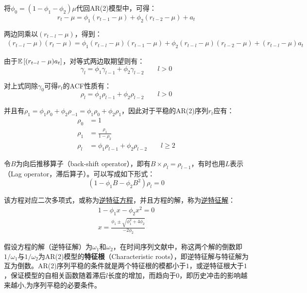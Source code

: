 \documentclass[11pt]{article}
\begin{document}
将$\phi_0 = (1-\phi_1-\phi_2)\mu$代回AR(2)模型中，可得：
\begin{equation*}
    r_t - \mu = \phi_1(r_{t-1}-\mu) + \phi_2(r_{t-2}-\mu) + a_t
\end{equation*}

两边同乘以$(r_{t-l}-\mu)$，得到：
\begin{align*}
    (r_{t-l} - \mu)(r_t - \mu) = \phi_1 (r_{t-l}-\mu)(r_{t-1} - \mu)
    + \phi_2 (r_{t-l}-\mu)(r_{t-2} - \mu) + (r_{t-l}-\mu) a_t
\end{align*}

由于$\mathbb{E}\left[(r_{t-l} - \mu)a_t\right]$，对等式两边取期望则有：
\begin{equation*}
    \gamma_l = \phi_1 \gamma_{l-1} + \phi_2 \gamma_{l-2} \qquad l>0
\end{equation*}

对上式同除$\gamma_0$可得$r_t$的ACF性质有：
\begin{equation*}
    \rho_l = \phi_1 \rho_{l-1} + \phi_2 \rho_{l-2} \qquad l>0
\end{equation*}

并且有$\rho_1 = \phi_1 \rho_{0} + \phi_2 \rho_{-1} = \phi_1 \rho_{0} + \phi_2 \rho_{1} $，因此对于平稳的AR(2)序列$r_t$应有：
\begin{align*}
    \rho_0 &= 1 \\
    \rho_1 &= \frac{\rho_1}{1-\rho_2} \\
    \rho_l &= \phi_1 \rho_{l-1} + \phi_2 \rho_{l-2} \qquad l \geq 2
\end{align*}

令$B$为向后推移算子（back-shift operator），即有$B \times \rho_l = \rho_{l-1}$，有时也用$L$表示（Lag operator，滞后算子）。可以写成如下形式：
\begin{equation*}
    (1-\phi_1 B - \phi_2 B^2)\rho_l = 0
\end{equation*}

该方程对应二次多项式，或称为\uline{逆特征方程}，并且方程的解，称为\uline{逆特征解}：
\begin{gather*}
    1 - \phi_1 x - \phi_2 x^2 = 0 \\
    x = \frac{\phi_1 \pm \sqrt{\phi_{1}^{2} + 4\phi_2}}{-2\phi_2}
\end{gather*}

假设方程的解（逆特征解）为$\omega_1$和$\omega_2$，在时间序列文献中，称这两个解的倒数即$1/\omega_1$与$1/\omega_2$为AR(2)模型的\textbf{特征根}（Characteristic roots），即逆特征解与特征解为互为倒数。AR(2)序列平稳的条件就是两个特征根的模都小于$1$，或逆特征根大于$1$，保证模型的自相关函数随着滞后$l$长度的增加，而趋向于$0$，即历史冲击的影响越来越小,为序列平稳的必要条件。
\end{document}
